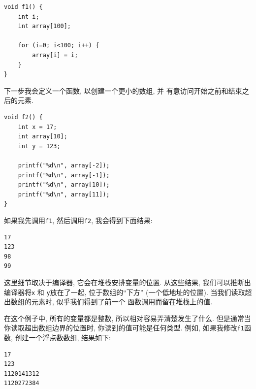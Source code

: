 \documentclass[12pt]{book}
\begin{document}
{\begin{verbatim}
void f1() {
    int i;
    int array[100];

    for (i=0; i<100; i++) {
        array[i] = i;
    }
}
\end{verbatim}

下一步我会定义一个函数, 以创建一个更小的数组, 并
有意访问开始之前和结束之后的元素.
\begin{verbatim}
void f2() {
    int x = 17;
    int array[10];
    int y = 123;

    printf("%d\n", array[-2]);
    printf("%d\n", array[-1]);
    printf("%d\n", array[10]);
    printf("%d\n", array[11]);
}
\end{verbatim}

如果我先调用{\tt f1}, 然后调用{\tt f2}, 我会得到下面结果:

\begin{verbatim}
17
123
98
99
\end{verbatim}

这里细节取决于编译器, 它会在堆栈安排变量的位置. 从这些结果, 
我们可以推断出编译器将{\tt x} 和 {\tt y}放在了一起, 位于数组的``下方''
(一个低地址的位置). 当我们读取超出数组的元素时, 似乎我们得到了前一个
函数调用而留在堆栈上的值. 

在这个例子中, 所有的变量都是整数, 所以相对容易弄清楚发生了什么. 
但是通常当你读取超出数组边界的位置时, 你读到的值可能是任何类型. 
例如, 如果我修改{\tt f1}函数, 创建一个浮点数数组, 结果如下: 

\begin{verbatim}
17
123
1120141312
1120272384
\end{verbatim}

}
\end{document}
